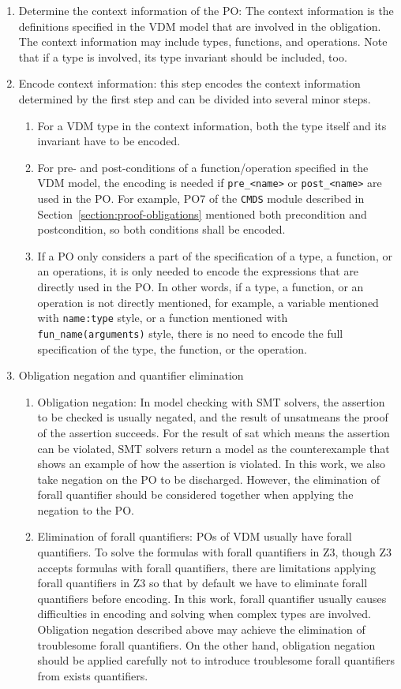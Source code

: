 \begin{enumerate}
\item
Determine the context information of the PO: The context information is the definitions specified in the VDM model that are involved in the obligation. The context information may include types, functions, and operations. Note that if a type is involved, its type invariant should be included, too.
\item
Encode context information: this step encodes the context information determined by the first step and can be divided into several minor steps.
\begin{enumerate}
\item
For a VDM type in the context information, both the type itself and its invariant have to be encoded.
\item
For pre- and post-conditions of a function/operation specified in the VDM model, the encoding is needed if {\tt pre\_<name>} or {\tt post\_<name>} are used in the PO. For example, PO7 of the {\tt CMDS} module described in Section~\ref{section:proof-obligations} mentioned both precondition and postcondition, so both conditions shall be encoded.
\item
If a PO only considers a part of the specification of a type, a function, or an operations, it is only needed to encode the expressions that are directly used in the PO. In other words, if a type, a function, or an operation is not directly mentioned, for example, a variable mentioned with {\tt name:type} style, or a function mentioned with {\tt fun\_name(arguments)} style, there is no need to encode the full specification of the type, the function, or the operation.
\end{enumerate}
\item
Obligation negation and quantifier elimination
\begin{enumerate}
\item
Obligation negation: In model checking with SMT solvers, the assertion to be checked is usually negated, and the result of unsatmeans the proof of the assertion succeeds. For the result of sat which means the assertion can be violated, SMT solvers return a model as the counterexample that shows an example of how the assertion is violated. In this work, we also take negation on the PO to be discharged. However, the elimination of forall quantifier should be considered together when applying the negation to the PO.
\item
Elimination of forall quantifiers: POs of VDM usually have forall quantifiers. To solve the formulas with forall quantifiers in Z3, though Z3 accepts formulas with forall quantifiers, there are limitations applying forall quantifiers in Z3 so that by default we have to eliminate forall quantifiers before encoding. In this work, forall quantifier usually causes difficulties in encoding and solving when complex types are involved. Obligation negation described above may achieve the elimination of troublesome forall quantifiers. On the other hand, obligation negation should be applied carefully not to introduce troublesome forall quantifiers from exists quantifiers.

\end{enumerate}
\end{enumerate}
